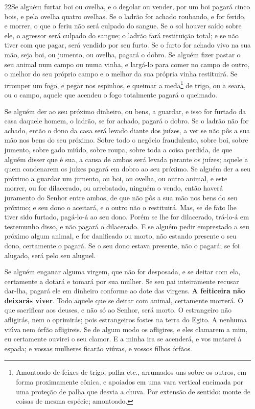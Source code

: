 \medskip

\lettrine{22} Se alguém furtar boi ou ovelha, e o degolar ou
vender, por um boi pagará cinco bois, e pela ovelha quatro ovelhas.
Se o ladrão for achado roubando, e for ferido, e morrer, o que o
feriu não será culpado do sangue. Se o sol houver saído sobre
ele, o agressor será culpado do sangue; o ladrão fará restituição
total; e se não tiver com que pagar, será vendido por seu furto.
Se o furto for achado vivo na sua mão, seja boi, ou jumento, ou
ovelha, pagará o dobro. Se alguém fizer pastar o seu animal num
campo ou numa vinha, e largá-lo para comer no campo de outro, o
melhor do seu próprio campo e o melhor da sua própria vinha
restituirá. Se irromper um fogo, e pegar nos espinhos, e queimar
a meda\footnote{Amontoado de feixes de trigo, palha etc., arrumados
uns sobre os outros, em forma proximamente cônica, e apoiados em uma
vara vertical encimada por uma proteção de palha que desvia a chuva.
Por extensão de sentido: monte de coisas de mesma espécie;
amontoado.} de trigo, ou a seara, ou o campo, aquele que acendeu o
fogo totalmente pagará o queimado.

Se alguém der ao seu próximo dinheiro, ou bens, a guardar, e isso
for furtado da casa daquele homem, o ladrão, se for achado, pagará o
dobro. Se o ladrão não for achado, então o dono da casa será
levado diante dos juízes, a ver se não pôs a sua mão nos bens do seu
próximo. Sobre todo o negócio fraudulento, sobre boi, sobre
jumento, sobre gado miúdo, sobre roupa, sobre toda a coisa perdida,
de que alguém disser que é sua, a causa de ambos será levada perante
os juízes; aquele a quem condenarem os juízes pagará em dobro ao seu
próximo. Se alguém der a seu próximo a guardar um jumento, ou
boi, ou ovelha, ou outro animal, e este morrer, ou for dilacerado,
ou arrebatado, ninguém o vendo, então haverá juramento do
Senhor entre ambos, de que não pôs a sua mão nos bens do seu
próximo; e seu dono o aceitará, e o outro não o restituirá.
Mas, se de fato lhe tiver sido furtado, pagá-lo-á ao seu
dono. Porém se lhe for dilacerado, trá-lo-á em testemunho
disso, e não pagará o dilacerado. E se alguém pedir
emprestado a seu próximo algum animal, e for danificado ou morto,
não estando presente o seu dono, certamente o pagará. Se o
seu dono estava presente, não o pagará; se foi alugado, será pelo
seu aluguel.

Se alguém enganar alguma virgem, que não for desposada, e se
deitar com ela, certamente a dotará e tomará por sua mulher.
Se seu pai inteiramente recusar dar-lha, pagará ele em
dinheiro conforme ao dote das virgens. \textbf{A feiticeira
não deixarás viver}. Todo aquele que se deitar com animal,
certamente morrerá. O que sacrificar aos deuses, e não só ao
Senhor, será morto. O estrangeiro não afligirás, nem o
oprimirás; pois estrangeiros fostes na terra do Egito. A
nenhuma viúva nem órfão afligireis. Se de algum modo os
afligires, e eles clamarem a mim, eu certamente ouvirei o seu
clamor. E a minha ira se acenderá, e vos matarei à espada; e
vossas mulheres ficarão viúvas, e vossos filhos órfãos.

